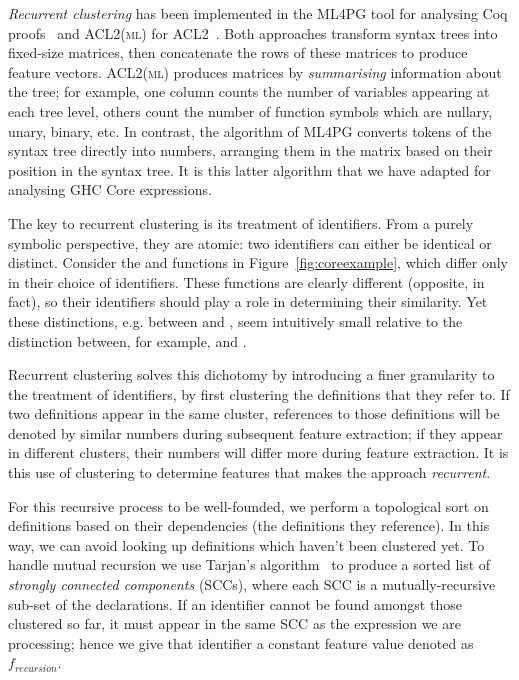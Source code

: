 \emph{Recurrent clustering} has been implemented in the
ML4PG tool for analysing Coq proofs~\cite{journals/corr/abs-1212-3618} and
\textsc{ACL2(ml)} for ACL2~\cite{heras2013proof}. Both approaches transform
syntax trees into fixed-size matrices, then concatenate the rows of these
matrices to produce feature vectors. \textsc{ACL2(ml)} produces matrices by
\emph{summarising} information about the tree; for example, one column counts
the number of variables appearing at each tree level, others count the number of
function symbols which are nullary, unary, binary, etc. In contrast, the
algorithm of ML4PG converts tokens of the syntax tree directly into numbers,
arranging them in the matrix based on their position in the syntax tree. It is
this latter algorithm that we have adapted for analysing GHC Core expressions.

The key to recurrent clustering is its treatment of identifiers. From a purely
symbolic perspective, they are atomic: two identifiers can either be identical
or distinct. Consider the  and  functions in
Figure~\ref{fig:coreexample}, which differ only in their choice of identifiers.
These functions are clearly different (opposite, in fact), so their identifiers
should play a role in determining their similarity. Yet these distinctions, e.g.
between  and , seem intuitively small relative to the
distinction between, for example,  and .

Recurrent clustering solves this dichotomy by introducing a finer granularity to
the treatment of identifiers, by first clustering the definitions that they
refer to. If two definitions appear in the same cluster, references to those
definitions will be denoted by similar numbers during subsequent feature
extraction; if they appear in different clusters, their numbers will differ more
during feature extraction. It is this use of clustering to determine features
that makes the approach \emph{recurrent}.

For this recursive process to be well-founded, we perform a topological sort on
definitions based on their dependencies (the definitions they reference). In
this way, we can avoid looking up definitions which haven't been clustered
yet. To handle mutual recursion we use Tarjan's algorithm~\cite{tarjan1972depth}
to produce a sorted list of \emph{strongly connected components} (SCCs), where
each SCC is a mutually-recursive sub-set of the declarations. If an identifier
cannot be found amongst those clustered so far, it must appear in the same SCC
as the expression we are processing; hence we give that identifier a constant
feature value denoted as $f_{recursion}$.

